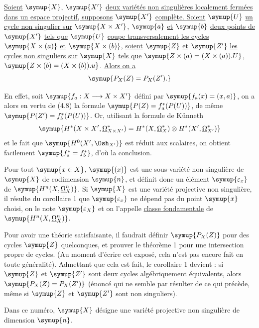  \uline{Soient} $\symup{X}$, $\symup{X'}$ \uline{deux variétés non singulières
localement fermées dans un espace projectif, supposons} $\symup{X'}$ \uline{complète. Soient} $\symup{U}$
\uline{un cycle non singulier sur} $\symup{X\times X'}$, $\symup{a}$ \uline{et} $\symup{b}$ \uline{deux points de} $\symup{X'}$ \uline{tels que}
$\symup{U}$ \uline{coupe transversalement les cycles} $\symup{X\times(a)}$ \uline{et} $\symup{X\times(b)}$, \uline{soient} $\symup{Z}$
\uline{et} $\symup{Z'}$ \uline{les cycles non singuliers sur} $\symup{X}$ \uline{tels que}
$\symup{Z\times(a)=(X\times(a)).U}$, $\symup{Z\times(b)=(X\times(b)).u}$.
\uline{Alors on a}
\[
  \symup{P_X(Z)=P_X(Z').}
\]

En effet, soit $\symup{f_a:X\longrightarrow X\times X'}$ défini par
$\symup{f_a(x)=(x,a)}$, on a alors en vertu de (4.8) la formule
$\symup{P(Z)=f_a^{*}(P(U))}$, de même $\symup{P(Z')=f_b^{*}(P(U))}$. Or, utilisant la formule de
Künneth
\[
  \symup{H^{*}(X\times X',\underline{\Omega}_{X\times X'}^{*})
  =H^{*}(X,\underline{\Omega}_X^{*})\otimes H^{*}(X',\underline{\Omega}_{X'}^{*})}
\]
et le fait que $\symup{H^{0}(X',\Osh_{X'})}$ est réduit aux scalaires, on obtient
facilement $\symup{f_a^{*}=f_b^{*}}$, d'où la conclusion.

Pour tout $\symup{x\in X}$, $\symup{(x)}$ est une sous-variété non singulière de $\symup{X}$ de
codimension $\symup{n}$, et définit donc un élément $\symup{\varepsilon_x}$ de
$\symup{H^{n}(X,\underline{\Omega}_X^{n})}$. Si $\symup{X}$ est une variété projective non singulière, il
résulte du corollaire 1 que $\symup{\varepsilon_x}$ ne dépend pas du point $\symup{x}$ choisi, on
le note $\symup{\varepsilon_X}$ et on l'appelle \uline{classe fondamentale} de
$\symup{H^{n}(X,\underline{\Omega}_X^{n})}$.

 Pour avoir une théorie satisfaisante, il faudrait définir
$\symup{P_X(Z)}$ pour des cycles $\symup{Z}$ quelconques, et prouver le théorème 1 pour une
intersection propre de cycles. (Au moment d'écrire cet exposé, cela n'est pas
encore fait en toute généralité). Admettant que cela est fait, le corollaire 1
devient : si $\symup{Z}$ et $\symup{Z'}$ sont deux cycles algébriquement équivalents, alors
$\symup{P_X(Z)=P_X(Z')}$ (énoncé qui ne semble par résulter de ce qui précède, même si
$\symup{Z}$ et $\symup{Z'}$ sont non singuliers).


Dans ce numéro, $\symup{X}$ désigne une variété projective non singulière de dimension
$\symup{n}$.

